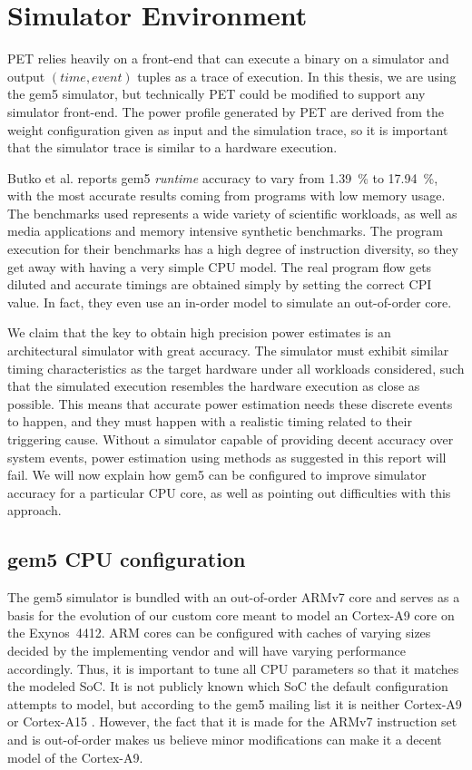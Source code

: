 \section{Simulator Environment}

PET relies heavily on a front-end that can execute a binary on a simulator and
output $(time, event)$ tuples as a trace of execution. In this thesis, we are
using the gem5 simulator, but technically PET could be modified to support any
simulator front-end. The power profile generated by PET are derived from the
weight configuration given as input and the simulation trace, so it is important
that the simulator trace is similar to a hardware execution.

Butko et al. \cite{butko2012accuracy} reports gem5 \emph{runtime} accuracy to
vary from 1.39~\% to 17.94~\%, with the most accurate results coming from
programs with low memory usage. The benchmarks used represents a wide variety of
scientific workloads, as well as media applications and memory intensive
synthetic benchmarks. The program execution for their benchmarks has a high
degree of instruction diversity, so they get away with having a very simple CPU
model. The real program flow gets diluted and accurate timings are obtained
simply by setting the correct CPI value. In fact, they even use an in-order
model to simulate an out-of-order core.

We claim that the key to obtain high precision power estimates is an
architectural simulator with great accuracy. The simulator must exhibit similar
timing characteristics as the target hardware under all workloads considered,
such that the simulated execution resembles the hardware execution as close as
possible. This means that accurate power estimation needs these discrete events
to happen, and they must happen with a realistic timing related to their
triggering cause. Without a simulator capable of providing decent accuracy over
system events, power estimation using methods as suggested in this report will
fail. We will now explain how gem5 can be configured to improve simulator
accuracy for a particular CPU core, as well as pointing out difficulties with
this approach.


\subsection{gem5 CPU configuration}
The gem5 simulator is bundled with an out-of-order ARMv7 core and serves as a
basis for the evolution of our custom core meant to model an Cortex-A9 core on
the Exynos~4412. ARM cores can be configured with caches of varying sizes
decided by the implementing vendor and will have varying performance
accordingly. Thus, it is important to tune all CPU parameters so that it matches
the modeled SoC. It is not publicly known which SoC the default configuration
attempts to model, but according to the gem5 mailing list it is neither
Cortex-A9 or Cortex-A15 \cite{a15maillist}. However, the fact that it is made
for the ARMv7 instruction set and is out-of-order makes us believe minor
modifications can make it a decent model of the Cortex-A9.


